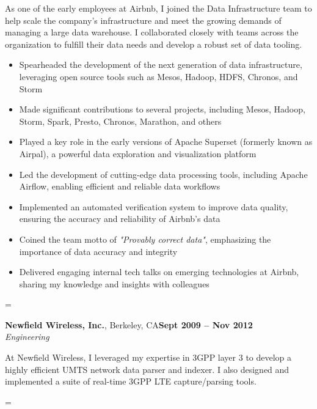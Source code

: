 \documentclass[margin,line]{resume}
\newenvironment{absolutelynopagebreak}
{\par\nobreak\vfil\penalty0\vfilneg
\vtop\bgroup}
{\par\xdef\tpd{\the\prevdepth}\egroup
\prevdepth=\tpd}
\begin{document}
\begin{resume}
\begin{absolutelynopagebreak}
As one of the early employees at Airbnb, I joined the Data Infrastructure team to help scale the company's infrastructure and meet the growing demands of managing a large data warehouse. I collaborated closely with teams across the organization to fulfill their data needs and develop a robust set of data tooling.

\begin{itemize}
\item Spearheaded the development of the next generation of data infrastructure, leveraging open source tools such as Mesos, Hadoop, HDFS, Chronos, and Storm
\item Made significant contributions to several projects, including Mesos, Hadoop, Storm, Spark, Presto, Chronos, Marathon, and others
\item Played a key role in the early versions of Apache Superset (formerly known as Airpal), a powerful data exploration and visualization platform
\item Led the development of cutting-edge data processing tools, including Apache Airflow, enabling efficient and reliable data workflows
\item Implemented an automated verification system to improve data quality, ensuring the accuracy and reliability of Airbnb's data
\item Coined the team motto of \emph{"Provably correct data"}, emphasizing the importance of data accuracy and integrity
\item Delivered engaging internal tech talks on emerging technologies at Airbnb, sharing my knowledge and insights with colleagues
\end{itemize}
\end{absolutelynopagebreak}

\vspace{5mm}

\begin{absolutelynopagebreak}
\textbf{Newfield Wireless, Inc.}, Berkeley, CA\hfill \textbf{Sept 2009 -- Nov 2012}\vspace{2mm}\\\vspace{1mm}%
\textsl{Engineering}

At Newfield Wireless, I leveraged my expertise in 3GPP layer 3 to develop a highly efficient UMTS network data parser and indexer. I also designed and implemented a suite of real-time 3GPP LTE capture/parsing tools.


\end{absolutelynopagebreak}
\end{resume}
\end{document}
